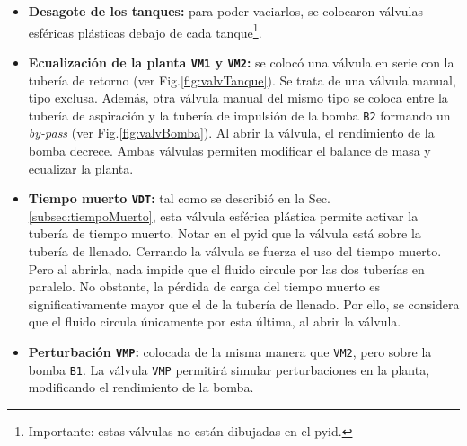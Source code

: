 \begin{itemize}
  \item \textbf{Desagote de los tanques:}
  para poder vaciarlos, se colocaron válvulas esféricas plásticas debajo de
cada tanque\footnote{Importante: estas válvulas no están dibujadas en el
\gls{pyid}.}.

  \item \textbf{Ecualización de la planta \texttt{VM1} y \texttt{VM2}:} se
colocó una válvula en serie con la tubería de retorno (ver
Fig.\ref{fig:valvTanque}).
Se trata de una
válvula manual, tipo exclusa.
Además, otra válvula manual del mismo tipo se coloca entre la tubería de
aspiración y
la tubería de impulsión de la bomba \verb|B2| formando un \emph{by-pass} (ver
Fig.\ref{fig:valvBomba}).
Al abrir la válvula, el rendimiento de la bomba decrece.
  Ambas válvulas permiten modificar el balance de masa y ecualizar la planta.

  \item \textbf{Tiempo muerto \texttt{VDT}:}
  tal como se describió en la Sec. \ref{subsec:tiempoMuerto}, esta válvula
esférica plástica permite activar la tubería de tiempo muerto.
  Notar en el \gls{pyid} que la válvula está sobre la tubería de llenado.
  Cerrando la válvula se fuerza el uso del tiempo muerto. Pero al
abrirla, nada impide que el fluido circule por las dos tuberías en paralelo.
  No obstante, la pérdida de carga del tiempo muerto es significativamente
mayor que el de la tubería de llenado.
  Por ello, se considera que el fluido circula únicamente por esta última, al
abrir la válvula.

  \item \textbf{Perturbación \texttt{VMP}:}
  colocada de la misma manera que \verb|VM2|, pero sobre la bomba \verb|B1|.
  La válvula \verb|VMP| permitirá simular perturbaciones en la planta,
modificando el rendimiento de la bomba.

\end{itemize}

